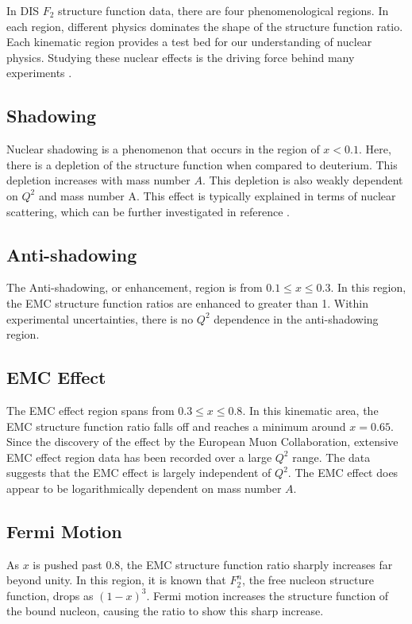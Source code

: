 In DIS $F_2$ structure function data, there are four phenomenological regions. In each region, different physics dominates the shape of the structure function ratio. Each kinematic region provides a test bed for our understanding of nuclear physics. Studying these nuclear effects is the driving force behind many experiments \cite{emc_regions,Smirnov99}.

\subsection{Shadowing}

Nuclear shadowing is a phenomenon that occurs in the region of $x<0.1$. Here, there is a depletion of the structure function when compared to deuterium. This depletion increases with mass number $A$. This depletion is also weakly dependent on $Q^2$ and mass number A. This effect is typically explained in terms of nuclear scattering, which can be further investigated in reference \cite{shadowing}.

\subsection{Anti-shadowing}

The Anti-shadowing, or enhancement, region is from $0.1 \leq x \leq 0.3$. In this region, the EMC structure function ratios are enhanced to greater than 1. Within experimental uncertainties, there is no $Q^2$ dependence in the anti-shadowing region.

\subsection{EMC Effect}

The EMC effect region spans from $0.3 \leq x \leq 0.8$. In this kinematic area, the EMC structure function ratio falls off and reaches a minimum around $x=0.65$. Since the discovery of the effect by the European Muon Collaboration, extensive EMC effect region data has been recorded over a large $Q^2$ range. The data suggests that the EMC effect is largely independent of $Q^2$. The EMC effect does appear to be logarithmically dependent on mass number $A$.

\subsection{Fermi Motion}

As $x$ is pushed past $0.8$, the EMC structure function ratio sharply increases far beyond unity. In this region, it is known that $F_2^n$, the free nucleon structure function, drops as $\left(1-x\right)^3$. Fermi motion increases the structure function of the bound nucleon, causing the ratio to show this sharp increase.